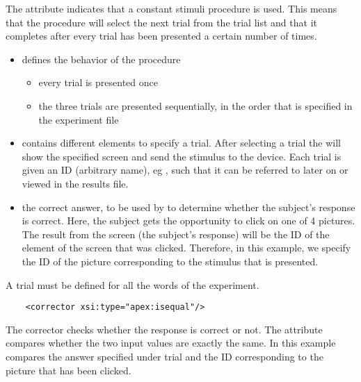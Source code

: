 The attribute 
indicates that a constant stimuli procedure is used. This means
that the procedure will select the next trial from the trial list
and that it completes after every trial has been presented a
certain number of times.
\begin{itemize}

\item {} defines the behavior of the procedure
\begin{itemize}

\item {} every trial is presented once

\item {}  the three trials are
presented sequentially, in the order that is specified in the
experiment file
\end{itemize}
 

\item {} contains different  elements
to specify a trial. After selecting a trial the
 will show the specified screen and send the
stimulus to the device. Each trial is given an ID (arbitrary
name), eg , such that it can be referred to later on
or viewed in the results file.

\item {} the correct answer, to be used by \apex to
determine whether the subject's response is correct. Here, the
subject gets the opportunity to click on one of 4 pictures. The
result from the screen (the subject's response) will be the ID of
the element of the screen that was clicked. Therefore, in this
example, we specify the ID of the picture corresponding to the
stimulus that is presented.
\end{itemize}

A trial must be defined for all the words of the experiment.

   

\begin{lstlisting}
    <corrector xsi:type="apex:isequal"/>
\end{lstlisting}

The corrector checks whether the response is correct or not. The
attribute  compares whether the two
input values are exactly the same. In this example
 compares the answer specified under trial and
the ID corresponding to the picture that has been clicked.

